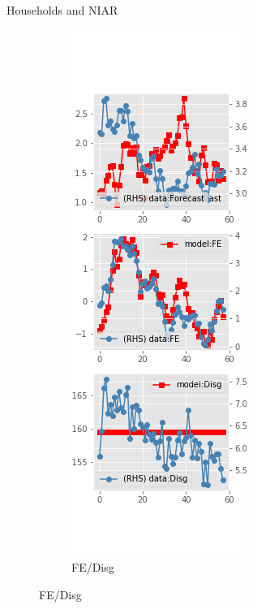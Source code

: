 \documentclass{beamer}
\begin{document}
\begin{frame}{Households and NIAR}
\begin{figure}[ht]
\begin{subfigure}[b]{0.2\textwidth}
		\end{subfigure}
		\hfill
		\begin{subfigure}[b]{0.2\textwidth}
			\caption{FE/Disg}
			\includegraphics[width=\textwidth, height = 0.8\textheight]{figuresDraft/sce_ni_est_diag2.png}

\end{subfigure}
\end{figure}
\end{frame}
\end{document}
